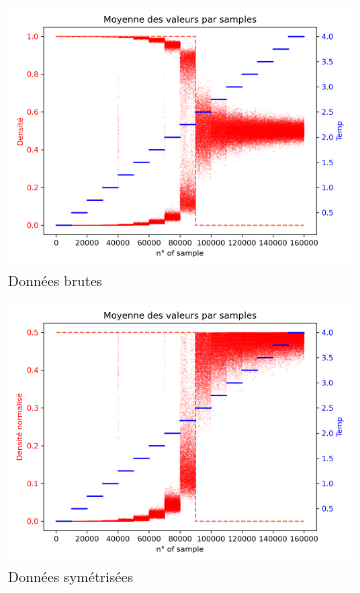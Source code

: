 \documentclass[11pt]{scrartcl} %
\begin{document}
\begin{figure}[h]
	\begin{subfigure}{0.5\textwidth}
		\includegraphics[width=0.95\linewidth]{./figures/raw_data.png}
		\caption{Données brutes}
		\label{fig:rawdata}
	\end{subfigure}
	\begin{subfigure}{0.5\textwidth}
		\includegraphics[width=0.95\linewidth]{./figures/sym_data.png}
		\caption{Données symétrisées}
		\label{fig:symdata}
	\end{subfigure}
	\caption{}
\end{figure}
\end{document}
